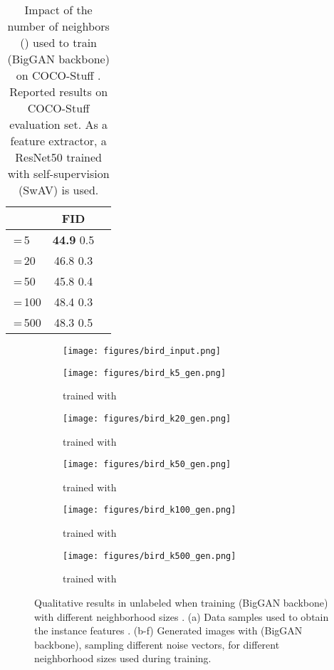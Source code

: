  
  
\begin{table}[h]
\footnotesize 
\caption{Impact of the number of neighbors () used to train \ours (BigGAN backbone) on COCO-Stuff . Reported results on COCO-Stuff evaluation set. As a feature extractor, a ResNet50 trained with self-supervision (SwAV) is used.}
\centering
 \begin{tabular}{@{}lcc@{}}
\toprule
 & \textbf{FID} \\ \midrule
\,=\,5 & \textbf{44.9}  0.5 \\ 
\,=\,20 & 46.8  0.3 \\ 
\,=\,50 & 45.8  0.4 \\ 
\,=\,100 & 48.4  0.3 \\ 
\,=\,500 & 48.3  0.5 \\
\bottomrule
\end{tabular}
  \label{table:ablation_coco}
 \end{table}
 
 
 
 \begin{figure}[h]
\footnotesize 
\centering
\begin{subfigure}{0.1\textwidth}
 \centering
\texttt{[image: figures/bird\_input.png]}
\caption{}
\label{subfig:icgan_unlabeled_input1}
\end{subfigure}
\begin{subfigure}{0.31\textwidth}
 \centering
\texttt{[image: figures/bird\_k5\_gen.png]}
\caption{\ours trained with }
\label{subfig:bird_k5}
\end{subfigure}
\begin{subfigure}{0.31\textwidth}
 \centering
\texttt{[image: figures/bird\_k20\_gen.png]}
\caption{\ours trained with }
\label{subfig:bird_k20}
\end{subfigure}
\begin{subfigure}{0.31\textwidth}
 \centering
\texttt{[image: figures/bird\_k50\_gen.png]}
\caption{\ours trained with }
\label{subfig:bird_k50}
\end{subfigure}
\begin{subfigure}{0.31\textwidth}
 \centering
\texttt{[image: figures/bird\_k100\_gen.png]}
\caption{\ours trained with }
\label{subfig:bird_k100}
\end{subfigure}
\begin{subfigure}{0.31\textwidth}
 \centering
\texttt{[image: figures/bird\_k500\_gen.png]}
\caption{\ours trained with }
\label{subfig:bird_k500}
\end{subfigure}
\caption{Qualitative results in  unlabeled \ImNet when training \ours (BigGAN backbone) with different neighborhood sizes . (a) Data samples  used to obtain the instance features .  (b-f) Generated images with \ours (BigGAN backbone), sampling different noise vectors, for different neighborhood sizes  used during training.}
\label{fig:icgan_k_effect}
\end{figure}